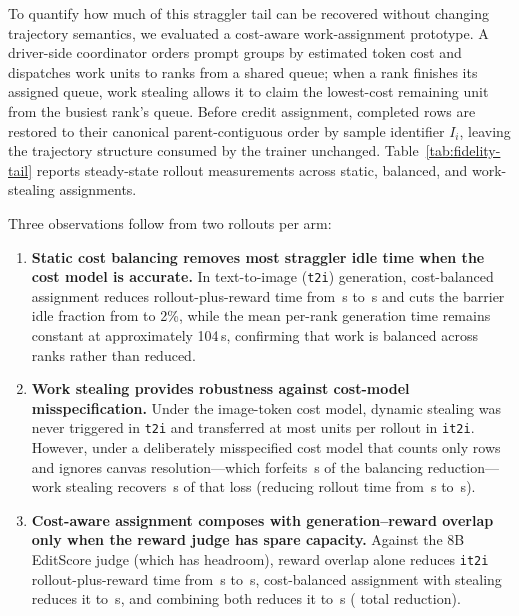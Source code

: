 To quantify how much of this straggler tail can be recovered without changing trajectory semantics, we evaluated a cost-aware work-assignment prototype.
A driver-side coordinator orders prompt groups by estimated token cost and dispatches work units to ranks from a shared queue; when a rank finishes its assigned queue, work stealing allows it to claim the lowest-cost remaining unit from the busiest rank's queue.
Before credit assignment, completed rows are restored to their canonical parent-contiguous order by sample identifier $I_i$, leaving the trajectory structure consumed by the trainer unchanged.
Table~\ref{tab:fidelity-tail} reports steady-state rollout measurements across static, balanced, and work-stealing assignments.

\begin{table}[H]
\caption{Comparison of rank assignment strategies on mixed-canvas batches (second rollout of each arm on one eight-GPU H20 node) for text-to-image (\texttt{t2i}) and image-to-image editing (\texttt{it2i}). ``Idle'' denotes the fraction of the rollout window during which at least one rank has completed generation and waits at the barrier. The cost model estimates work by output image tokens. Evaluated on an experimental branch without an open pull request.}
\label{tab:fidelity-tail}
\centering
\small

\end{table}

Three observations follow from two rollouts per arm:
\begin{enumerate}
  \item \textbf{Static cost balancing removes most straggler idle time when the cost model is accurate.} In text-to-image (\texttt{t2i}) generation, cost-balanced assignment reduces rollout-plus-reward time from \RFTtoiBase{}\,s to \RFTtoiBalanced{}\,s and cuts the barrier idle fraction from \RFTtoiIdle{} to 2\%, while the mean per-rank generation time remains constant at approximately 104\,s, confirming that work is balanced across ranks rather than reduced.
  \item \textbf{Work stealing provides robustness against cost-model misspecification.} Under the image-token cost model, dynamic stealing was never triggered in \texttt{t2i} and transferred at most \RFStealPixelsEditMax{} units per rollout in \texttt{it2i}. However, under a deliberately misspecified cost model that counts only rows and ignores canvas resolution---which forfeits \RFNaiveGap{}\,s of the balancing reduction---work stealing recovers \RFStealRecovered{}\,s of that loss (reducing rollout time from \RFNaiveBalanced{}\,s to \RFNaiveSteal{}\,s).
  \item \textbf{Cost-aware assignment composes with generation--reward overlap only when the reward judge has spare capacity.} Against the 8B EditScore judge (which has headroom), reward overlap alone reduces \texttt{it2i} rollout-plus-reward time from \RFSmallBase{}\,s to \RFSmallOverlap{}\,s, cost-balanced assignment with stealing reduces it to \RFSmallSteal{}\,s, and combining both reduces it to \RFSmallBoth{}\,s (\RFSmallBothSaving{} total reduction).
\end{enumerate}

